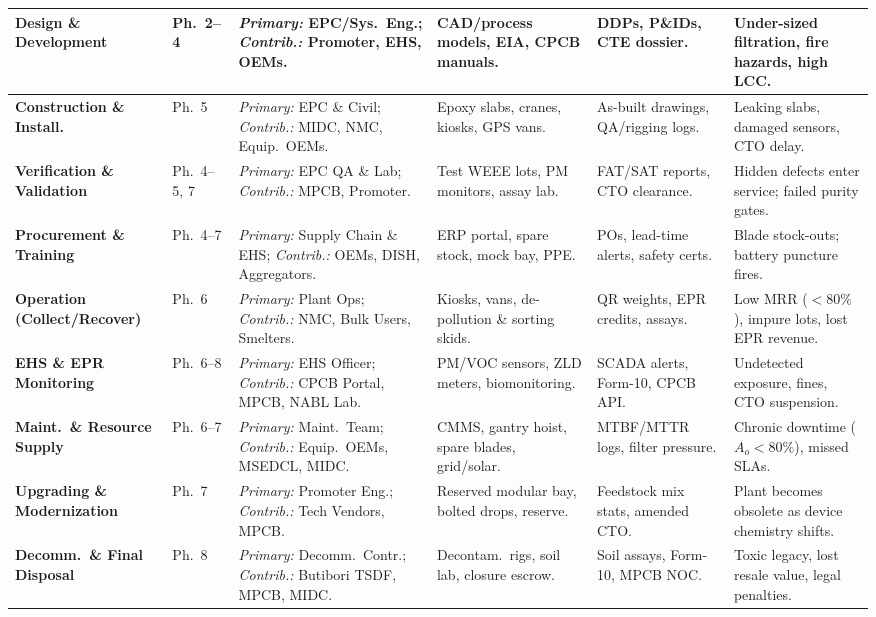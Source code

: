 \begin{xltabular}{\textwidth}{L{2.05cm} L{1.35cm} L{2.45cm} L{2.2cm} L{2.1cm} Y}
\textbf{Design \& Development} & Ph.\ 2--4 & \textit{Primary:} EPC/Sys.\ Eng.; \textit{Contrib.:} Promoter, EHS, OEMs. & CAD/process models, EIA, CPCB manuals. & DDPs, P\&IDs, CTE dossier. & Under-sized filtration, fire hazards, high LCC. \\
\midrule
\textbf{Construction \& Install.} & Ph.\ 5 & \textit{Primary:} EPC \& Civil; \textit{Contrib.:} MIDC, NMC, Equip.\ OEMs. & Epoxy slabs, cranes, kiosks, GPS vans. & As-built drawings, QA/rigging logs. & Leaking slabs, damaged sensors, CTO delay. \\
\midrule
\textbf{Verification \& Validation} & Ph.\ 4--5, 7 & \textit{Primary:} EPC QA \& Lab; \textit{Contrib.:} MPCB, Promoter. & Test WEEE lots, PM monitors, assay lab. & FAT/SAT reports, CTO clearance. & Hidden defects enter service; failed purity gates. \\
\midrule
\textbf{Procurement \& Training} & Ph.\ 4--7 & \textit{Primary:} Supply Chain \& EHS; \textit{Contrib.:} OEMs, DISH, Aggregators. & ERP portal, spare stock, mock bay, PPE. & POs, lead-time alerts, safety certs. & Blade stock-outs; battery puncture fires. \\
\midrule
\textbf{Operation (Collect/Recover)} & Ph.\ 6 & \textit{Primary:} Plant Ops; \textit{Contrib.:} NMC, Bulk Users, Smelters. & Kiosks, vans, de-pollution \& sorting skids. & QR weights, EPR credits, assays. & Low MRR ($<80\%$), impure lots, lost EPR revenue. \\
\midrule
\textbf{EHS \& EPR Monitoring} & Ph.\ 6--8 & \textit{Primary:} EHS Officer; \textit{Contrib.:} CPCB Portal, MPCB, NABL Lab. & PM/VOC sensors, ZLD meters, biomonitoring. & SCADA alerts, Form-10, CPCB API. & Undetected exposure, fines, CTO suspension. \\
\midrule
\textbf{Maint.\ \& Resource Supply} & Ph.\ 6--7 & \textit{Primary:} Maint.\ Team; \textit{Contrib.:} Equip.\ OEMs, MSEDCL, MIDC. & CMMS, gantry hoist, spare blades, grid/solar. & MTBF/MTTR logs, filter pressure. & Chronic downtime ($A_o < 80\%$), missed SLAs. \\
\midrule
\textbf{Upgrading \& Modernization} & Ph.\ 7 & \textit{Primary:} Promoter Eng.; \textit{Contrib.:} Tech Vendors, MPCB. & Reserved modular bay, bolted drops, reserve. & Feedstock mix stats, amended CTO. & Plant becomes obsolete as device chemistry shifts. \\
\midrule
\textbf{Decomm.\ \& Final Disposal} & Ph.\ 8 & \textit{Primary:} Decomm.\ Contr.; \textit{Contrib.:} Butibori TSDF, MPCB, MIDC. & Decontam.\ rigs, soil lab, closure escrow. & Soil assays, Form-10, MPCB NOC. & Toxic legacy, lost resale value, legal penalties. \\

\end{xltabular}
\endgroup
